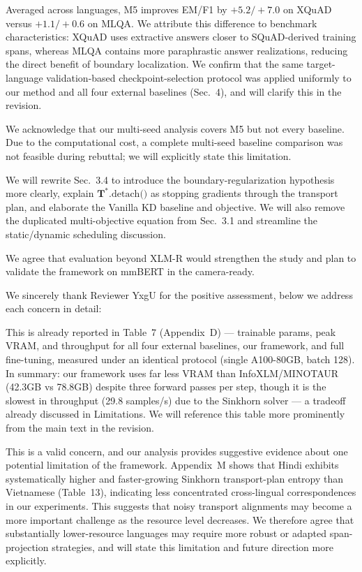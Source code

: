 Averaged across languages, M5 improves EM/F1 by $+5.2/+7.0$ on XQuAD versus $+1.1/+0.6$ on MLQA. We attribute this difference to benchmark characteristics: XQuAD uses extractive answers closer to SQuAD-derived training spans, whereas MLQA contains more paraphrastic answer realizations, reducing the direct benefit of boundary localization. We confirm that the same target-language validation-based checkpoint-selection protocol was applied uniformly to our method and all four external baselines (Sec.~4), and will clarify this in the revision.

We acknowledge that our multi-seed analysis covers M5 but not every baseline. Due to the computational cost, a complete multi-seed baseline comparison was not feasible during rebuttal; we will explicitly state this limitation.

We will rewrite Sec.~3.4 to introduce the boundary-regularization hypothesis more clearly, explain $\mathbf{T}^*.\text{detach()}$ as stopping gradients through the transport plan, and elaborate the Vanilla KD baseline and objective. We will also remove the duplicated multi-objective equation from Sec.~3.1 and streamline the static/dynamic scheduling discussion.

We agree that evaluation beyond XLM-R would strengthen the study and plan to validate the framework on mmBERT in the camera-ready.


We sincerely thank Reviewer YxgU for the positive assessment, below we address each concern in detail:

This is already reported in Table~7 (Appendix~D) --- trainable params, peak VRAM, and throughput for all four external baselines, our framework, and full fine-tuning, measured under an identical protocol (single A100-80GB, batch 128). In summary: our framework uses far less VRAM than InfoXLM/MINOTAUR (42.3GB vs 78.8GB) despite three forward passes per step, though it is the slowest in throughput (29.8 samples/s) due to the Sinkhorn solver --- a tradeoff already discussed in Limitations. We will reference this table more prominently from the main text in the revision.

This is a valid concern, and our analysis provides suggestive evidence about one potential limitation of the framework. Appendix~M shows that Hindi exhibits systematically higher and faster-growing Sinkhorn transport-plan entropy than Vietnamese (Table~13), indicating less concentrated cross-lingual correspondences in our experiments. This suggests that noisy transport alignments may become a more important challenge as the resource level decreases. We therefore agree that substantially lower-resource languages may require more robust or adapted span-projection strategies, and will state this limitation and future direction more explicitly.
